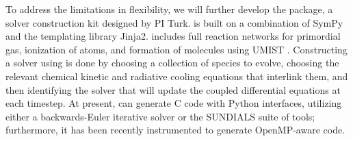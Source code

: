 


To address the limitations in  flexibility, we will
further develop the \dengo{} package, a solver construction kit
designed by PI Turk. \dengo{} is built on a combination of SymPy and
the templating library Jinja2. \dengo{} includes full reaction
networks for primordial gas, ionization of atoms, and formation of molecules using UMIST
\citep{2013A&A...550A..36M}.  Constructing a solver using \dengo{} is done by
choosing a collection of species to evolve, choosing the relevant chemical
kinetic and radiative cooling equations that interlink them, and then
identifying the solver that will update the coupled differential equations at
each timestep. At present, \dengo{} can generate C code with Python
interfaces, utilizing either a backwards-Euler iterative solver or the SUNDIALS
suite of tools; furthermore, it has been recently instrumented to generate
OpenMP-aware code.

